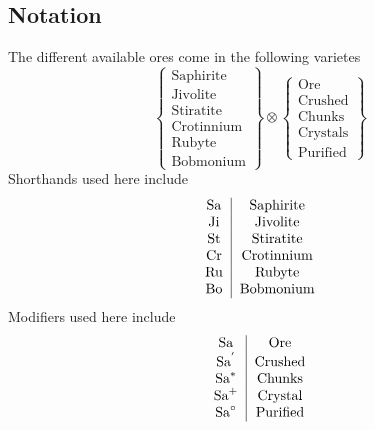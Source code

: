 



\section{}
\begin{multicols*}{2}
    \subsection{Notation}
    The different available ores come in the following varietes
    \[
    \begin{Bmatrix}
        \text{Saphirite}\\
        \text{Jivolite}\\
        \text{Stiratite}\\
        \text{Crotinnium}\\
        \text{Rubyte}\\
        \text{Bobmonium}
    \end{Bmatrix}
    \otimes
    \begin{Bmatrix}
        \text{Ore}\\
        \text{Crushed}\\
        \text{Chunks}\\
        \text{Crystals}\\
        \text{Purified}
    \end{Bmatrix}
    \]
    Shorthands used here include
    \[
        \begin{tabular}{ c | c }
            Sa & Saphirite\\
            Ji & Jivolite\\
            St & Stiratite\\
            Cr & Crotinnium\\
            Ru & Rubyte\\
            Bo & Bobmonium
        \end{tabular}
    \]
    Modifiers used here include
    \[
        \begin{tabular}{ c | c }
            \(\text{Sa}\) & Ore\\
            \(\text{Sa}^{'}\) & Crushed\\
            \(\text{Sa}^{*}\) & Chunks\\
            \(\text{Sa}^{+}\) & Crystal\\
            \(\text{Sa}^{\circ}\) & Purified
        \end{tabular}
    \]

\end{multicols*}
